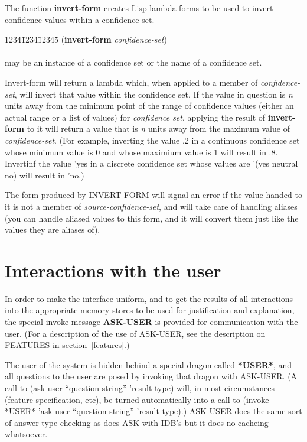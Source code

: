 The function {\bf invert-form} creates Lisp lambda forms to be used
to invert confidence values within a confidence set.

\begin{tabbing}
1234\=1234\=12345\= \kill
({\bf invert-form} {\it confidence-set\/}) \\
\\
 may be an instance of a confidence set or the
name of a confidence set. \\
\end{tabbing}
Invert-form will return a lambda which, when applied to a member of
{\it confidence-set\/}, will invert that value within the confidence
set. If the value in question is {\it n} units away from the minimum
point of the range of confidence values (either an actual range or a
list of values) for {\it confidence set\/}, applying the result of
{\bf invert-form} to it will return a value that is {\it n} units away
from the maximum value of {\it confidence-set\/}. (For example,
inverting the value .2 in a continuous confidence set whose minimum
value is 0 and whose maximium value is 1 will result in .8. Invertinf
the value 'yes in a discrete confidence set whose values are '(yes
neutral no) will result in 'no.) 

The form produced by INVERT-FORM will signal an error if the value
handed to it is not a member of {\it source-confidence-set\/}, and
will take care of handling aliases (you can handle aliased values to
this form, and it will convert them just like the values they are
aliases of).




\chapter{Interactions with the user}

In order to make the interface uniform, and to get the results of all
interactions into the appropriate memory stores to be used for
justification and explanation, the special invoke message {\bf
ASK-USER} is provided for communication with the user. (For a
description of the use of ASK-USER, see the description on FEATURES in
section~\ref{features}.)

The user of the system is hidden behind a special dragon called {\bf
*USER*}, and all questions to the user are posed by invoking that
dragon with ASK-USER. (A call to (ask-user ``question-string''
'result-type) will, in most circumstances (feature specification,
etc), be turned automatically into a call to (invoke *USER* 'ask-user
``question-string'' 'result-type).) ASK-USER does the same sort of
answer type-checking as does ASK with IDB's but it does no cacheing
whatsoever. 

